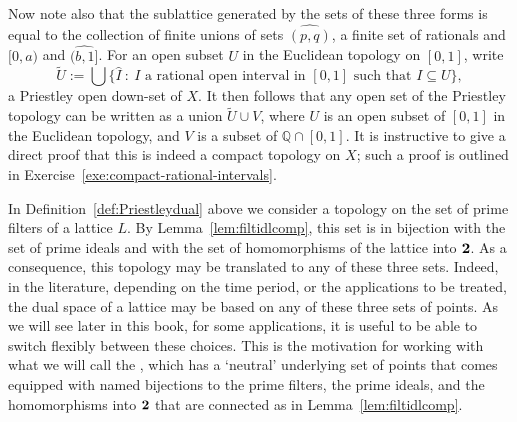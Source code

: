 \begin{example}
Now note also that the sublattice generated by the sets of these three forms is equal to the collection of finite unions of sets $\widehat{(p,q)}$, a finite set of rationals and $\widehat{[0,a)}$ and $\widehat{(b,1]}$. For an open subset $U$ in the Euclidean topology on $[0,1]$, write
\[\tilde{U} := \bigcup \{ \widehat{I} \ \colon \ I \text{ a rational open interval in } [0,1] \text{ such that } I \subseteq U\},\] 
a Priestley open down-set of $X$. It then follows that any open set of the Priestley topology can be written as a union $\tilde{U} \cup V$, where $U$ is an open subset of $[0,1]$ in the Euclidean topology, and $V$ is a subset of $\mathbb{Q} \cap [0,1]$. It is instructive to give a direct proof that this is indeed a compact topology on $X$; such a proof is outlined in Exercise~\ref{exe:compact-rational-intervals}.
\end{example}

In Definition~\ref{def:Priestleydual} above we consider a topology on the set of prime filters of a lattice $L$. By Lemma~\ref{lem:filtidlcomp}, this set is in bijection with the set of prime ideals and with the set of homomorphisms of the lattice into ${\bf 2}$. As a consequence, this topology may be translated to any of these three sets. Indeed, in the literature, depending on the time period, or the applications to be treated, the dual space of a lattice may be based on any of these three sets of points. As we will see later in this book, for some applications, it is useful to be able to switch flexibly between these choices. This is the motivation for working with what we will call the , which has a `neutral' underlying set of points that comes equipped with named bijections to the prime filters, the prime ideals, and the homomorphisms into ${\bf 2}$ that are connected as in Lemma~\ref{lem:filtidlcomp}.

